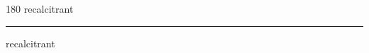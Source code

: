 
\begin{frame}
\begin{center}
\begin{turn}{180}
{\fontsize{2.5cm}{1em}\selectfont recalcitrant}
\end{turn}
\vspace{1em}\par  
\hrule
\vspace{1em}\par  
{\fontsize{2.5cm}{1em}\selectfont recalcitrant}
\end{center}
\end{frame}
